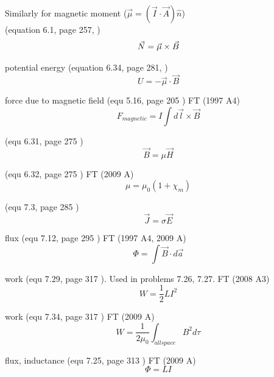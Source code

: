 \documentclass[12pt]{article}  %
\def\qualifyingyear{F}
\begin{document}
Similarly for magnetic moment ($\vec{\mu} = (\vec{I} \cdot \vec{A})\hat{n}$) \\ 
(equation 6.1, page 257, \cite{GriffithED}) 
\begin{equation}
\vec{N} = \vec{\mu} \times \vec{B} \\ 
\end{equation}

potential energy (equation 6.34, page 281, \cite{GriffithED}) 
\begin{equation}
U = -\vec{\mu} \cdot \vec{B}
\end{equation}

force due to magnetic field (equ 5.16, page 205 \cite{GriffithED})
\if\qualifyingyear T
(1997 A4)
\fi
\begin{equation}
 F_{magnetic} = I \int d\vec{l} \times \vec{B}
\end{equation}

(equ 6.31, page 275 \cite{GriffithED})
\begin{equation}
 \vec{B} = \mu \vec{H}
\end{equation}

(equ 6.32, page 275 \cite{GriffithED}) 
\if\qualifyingyear T
(2009 A)
\fi
\begin{equation}
 \mu = \mu_0 (1+\chi_m)
\end{equation}

(equ 7.3, page 285 \cite{GriffithED})
\begin{equation}
 \vec{J} = \sigma \vec{E}
\end{equation}

flux (equ 7.12, page 295 \cite{GriffithED}) 
\if\qualifyingyear T
(1997 A4, 2009 A)
\fi
\begin{equation}
 \Phi = \int \vec{B} \cdot d\vec{a}
\end{equation}

work (equ 7.29, page 317 \cite{GriffithED}). Used in problems 7.26, 7.27. 
\if\qualifyingyear T
(2008 A3)
\fi
\begin{equation}
  W = \frac{1}{2} L I^2
	\label{eq:work_self_inductance}
\end{equation}

work (equ 7.34, page 317 \cite{GriffithED}) 
\if\qualifyingyear T
(2009 A)
\fi
\begin{equation}
  W = \frac{1}{2 \mu_0} \int_{all space} B^2 d \tau
	\label{eq:work_in_magnetic_field}
\end{equation}

flux, inductance (equ 7.25, page 313 \cite{GriffithED})
\if\qualifyingyear T
(2009 A)
\fi
\begin{equation}
 \Phi = L I
\end{equation}
\end{document}
